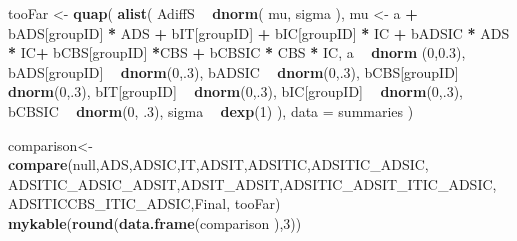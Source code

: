 \documentclass[10pt,dvipsnames,enabledeprecatedfontcommands]{scrartcl}
\newenvironment{Shaded}{\begin{snugshade}}{\end{snugshade}}
\newcommand{\KeywordTok}[1]{\textcolor[rgb]{0.13,0.29,0.53}{\textbf{#1}}}
\newcommand{\DataTypeTok}[1]{\textcolor[rgb]{0.13,0.29,0.53}{#1}}
\newcommand{\DecValTok}[1]{\textcolor[rgb]{0.00,0.00,0.81}{#1}}
\newcommand{\FloatTok}[1]{\textcolor[rgb]{0.00,0.00,0.81}{#1}}
\newcommand{\StringTok}[1]{\textcolor[rgb]{0.31,0.60,0.02}{#1}}
\newcommand{\OperatorTok}[1]{\textcolor[rgb]{0.81,0.36,0.00}{\textbf{#1}}}
\newcommand{\NormalTok}[1]{#1}
\begin{document}
\begin{Shaded}
\begin{Highlighting}[]
\NormalTok{tooFar <-}\StringTok{ }\KeywordTok{quap}\NormalTok{(}
  \KeywordTok{alist}\NormalTok{(}
\NormalTok{    AdiffS }\OperatorTok{~}\StringTok{ }\KeywordTok{dnorm}\NormalTok{( mu, sigma ),}
\NormalTok{    mu <-}\StringTok{ }\NormalTok{a }\OperatorTok{+}\StringTok{ }\NormalTok{bADS[groupID] }\OperatorTok{*}\StringTok{ }\NormalTok{ADS }\OperatorTok{+}\StringTok{  }\NormalTok{bIT[groupID] }\OperatorTok{+}\StringTok{ }\NormalTok{bIC[groupID] }\OperatorTok{*}\StringTok{ }\NormalTok{IC }\OperatorTok{+}\StringTok{ }
\StringTok{      }\NormalTok{bADSIC }\OperatorTok{*}\StringTok{ }\NormalTok{ADS }\OperatorTok{*}\StringTok{ }\NormalTok{IC}\OperatorTok{+}\StringTok{ }\NormalTok{bCBS[groupID] }\OperatorTok{*}\NormalTok{CBS }\OperatorTok{+}\StringTok{ }\NormalTok{bCBSIC }\OperatorTok{*}\StringTok{ }\NormalTok{CBS }\OperatorTok{*}\StringTok{ }\NormalTok{IC, }
\NormalTok{    a }\OperatorTok{~}\StringTok{ }\KeywordTok{dnorm}\NormalTok{ (}\DecValTok{0}\NormalTok{,}\FloatTok{0.3}\NormalTok{),}
\NormalTok{    bADS[groupID] }\OperatorTok{~}\StringTok{ }\KeywordTok{dnorm}\NormalTok{(}\DecValTok{0}\NormalTok{,.}\DecValTok{3}\NormalTok{),}
\NormalTok{    bADSIC }\OperatorTok{~}\StringTok{ }\KeywordTok{dnorm}\NormalTok{(}\DecValTok{0}\NormalTok{,.}\DecValTok{3}\NormalTok{),}
\NormalTok{    bCBS[groupID] }\OperatorTok{~}\StringTok{ }\KeywordTok{dnorm}\NormalTok{(}\DecValTok{0}\NormalTok{,.}\DecValTok{3}\NormalTok{),}
\NormalTok{    bIT[groupID] }\OperatorTok{~}\StringTok{ }\KeywordTok{dnorm}\NormalTok{(}\DecValTok{0}\NormalTok{,.}\DecValTok{3}\NormalTok{),}
\NormalTok{    bIC[groupID] }\OperatorTok{~}\StringTok{ }\KeywordTok{dnorm}\NormalTok{(}\DecValTok{0}\NormalTok{,.}\DecValTok{3}\NormalTok{),}
\NormalTok{     bCBSIC }\OperatorTok{~}\StringTok{ }\KeywordTok{dnorm}\NormalTok{(}\DecValTok{0}\NormalTok{, }\FloatTok{.3}\NormalTok{),}
\NormalTok{    sigma  }\OperatorTok{~}\StringTok{ }\KeywordTok{dexp}\NormalTok{(}\DecValTok{1}\NormalTok{)}
\NormalTok{  ), }
  \DataTypeTok{data =}\NormalTok{ summaries}
\NormalTok{)}
\end{Highlighting}
\end{Shaded}

\normalsize

\vspace{1mm} \footnotesize

\begin{Shaded}
\begin{Highlighting}[]
\NormalTok{comparison<-}\StringTok{ }\KeywordTok{compare}\NormalTok{(null,ADS,ADSIC,IT,ADSIT,ADSITIC,ADSITIC_ADSIC,}
\NormalTok{                     ADSITIC_ADSIC_ADSIT,ADSIT_ADSIT,ADSITIC_ADSIT_ITIC_ADSIC,}
\NormalTok{                     ADSITICCBS_ITIC_ADSIC,Final, tooFar)}
\KeywordTok{mykable}\NormalTok{(}\KeywordTok{round}\NormalTok{(}\KeywordTok{data.frame}\NormalTok{(comparison ),}\DecValTok{3}\NormalTok{)) }
\end{Highlighting}
\end{Shaded}
\end{document}
